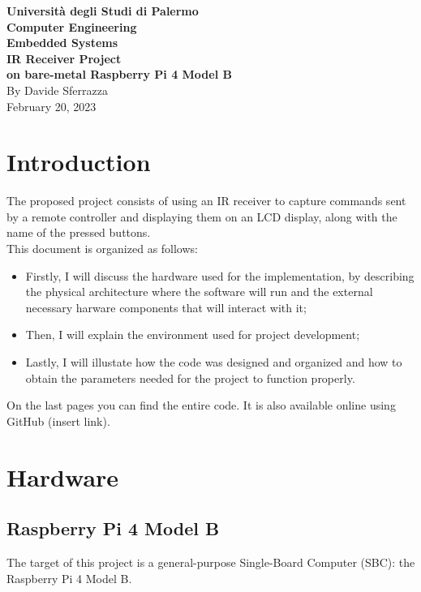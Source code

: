 \documentclass[a4paper, 12pt]{article}
\begin{document}
\begin{titlepage}
    \begin{center}
        \vspace*{1cm}
        \Large\textbf{Università degli Studi di Palermo } \\
        \Large\textbf{Computer Engineering} \\
        \vfill
        \Huge\textbf{Embedded Systems} \\[3mm]
        \Large\textbf{IR Receiver Project \\ on bare-metal Raspberry Pi 4 Model B} \\[1mm]
        \vfill
        By Davide Sferrazza\\
        February 20, 2023
    \end{center}
\end{titlepage}

\tableofcontents
\thispagestyle{empty}
\clearpage

\setcounter{page}{1}

\section{Introduction}
The proposed project consists of using an IR receiver to capture commands sent by a remote controller and displaying them on an LCD display, along with the name of the pressed buttons. \\
This document is organized as follows:
\begin{itemize}
    \item Firstly, I will discuss the hardware used for the implementation, by describing the physical architecture where the software will run and the external necessary harware components that will interact with it;
    \item  Then, I will explain the environment used for project development;
    \item Lastly, I will illustate how the code was designed and organized and how to obtain the parameters needed for the project to function properly.
\end{itemize}

On the last pages you can find the entire code. It is also available online using GitHub (insert link). 

\section{Hardware}
\subsection{Raspberry Pi 4 Model B}
The target of this project is a general-purpose Single-Board Computer (SBC): the Raspberry Pi 4 Model B. 
\end{document}

